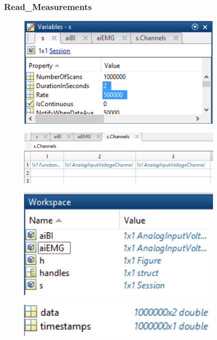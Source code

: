 \subsubsection{Read\_Measurements}

\begin{figure}[H] 
\centering
{\includegraphics[width=10cm]
{Figure/modultestread3}}
\caption{}
\label{fig:modultestread3}
\end{figure}


\begin{figure}[H] 
\centering
{\includegraphics[width=10cm]
{Figure/modultestread2}}
\caption{}
\label{fig:modultestread2}
\end{figure}

\begin{figure}[H] 
\centering
{\includegraphics[width=10cm]
{Figure/modultestread4}}
\caption{}
\label{fig:modultestread4}
\end{figure}

\begin{figure}[H] 
\centering
{\includegraphics[width=10cm]
{Figure/modultestread5}}
\caption{}
\label{fig:modultestread5}
\end{figure}

